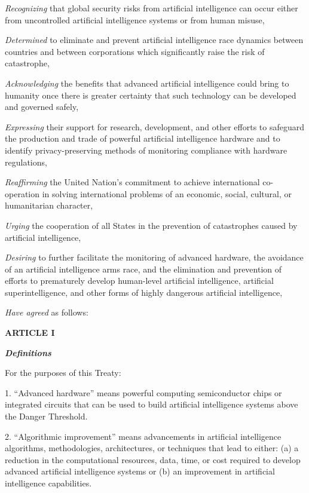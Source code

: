 \documentclass[12pt,a4paper]{article}
\begin{document}
\textit{Recognizing} that global security risks from artificial intelligence can occur either from uncontrolled artificial intelligence systems or from human misuse,

\textit{Determined} to eliminate and prevent artificial intelligence race dynamics between countries and between corporations which significantly raise the risk of catastrophe,

\textit{Acknowledging} the benefits that advanced artificial intelligence could bring to humanity once there is greater certainty that such technology can be developed and governed safely,

\textit{Expressing} their support for research, development, and other efforts to safeguard the production and trade of powerful artificial intelligence hardware and to identify privacy-preserving methods of monitoring compliance with hardware regulations, 

\textit{Reaffirming} the United Nation’s commitment to achieve international co-operation in solving international problems of an economic, social, cultural, or humanitarian character,

\textit{Urging} the cooperation of all States in the prevention of catastrophes caused by artificial intelligence,

\textit{Desiring} to further facilitate the monitoring of advanced hardware, the avoidance of an artificial intelligence arms race, and the elimination and prevention of efforts to prematurely develop human-level artificial intelligence, artificial superintelligence, and other forms of highly dangerous artificial intelligence, 

\textit{Have agreed} as follows:

\begin{center}

\textbf{{ARTICLE I}}

\textit{\textbf{Definitions}}
\end{center}

For the purposes of this Treaty:

1. “Advanced hardware” means powerful computing semiconductor chips or integrated circuits that can be used to build artificial intelligence systems above the Danger Threshold. 

2. “Algorithmic improvement” means advancements in artificial intelligence algorithms, methodologies, architectures, or techniques that lead to either: (a) a reduction in the computational resources, data, time, or cost required to develop advanced artificial intelligence systems or (b) an improvement in artificial intelligence capabilities.
\end{document}
